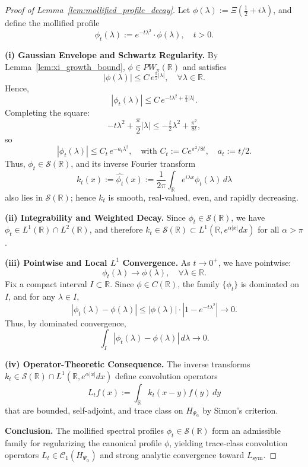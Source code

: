 \begin{proof}[Proof of Lemma~\ref{lem:mollified_profile_decay}]
Let \( \phi(\lambda) := \Xi\left( \tfrac{1}{2} + i\lambda \right) \), and define the mollified profile
\[
\phi_t(\lambda) := e^{-t\lambda^2} \cdot \phi(\lambda), \quad t > 0.
\]

\medskip
\noindent\textbf{(i) Gaussian Envelope and Schwartz Regularity.}
By Lemma~\ref{lem:xi_growth_bound}, \( \phi \in PW_\pi(\mathbb{R}) \) and satisfies
\[
|\phi(\lambda)| \le C\, e^{\frac{\pi}{2} |\lambda|}, \quad \forall \lambda \in \mathbb{R}.
\]
Hence,
\[
|\phi_t(\lambda)| \le C\, e^{-t\lambda^2 + \frac{\pi}{2} |\lambda|}.
\]
Completing the square:
\[
-t\lambda^2 + \frac{\pi}{2}|\lambda| \le -\tfrac{t}{2}\lambda^2 + \tfrac{\pi^2}{8t},
\]
so
\[
|\phi_t(\lambda)| \le C_t\, e^{-a_t \lambda^2}, \quad \text{with } C_t := C e^{\pi^2/8t}, \quad a_t := t/2.
\]
Thus, \( \phi_t \in \mathcal{S}(\mathbb{R}) \), and its inverse Fourier transform
\[
k_t(x) := \widehat{\phi_t}(x) := \frac{1}{2\pi} \int_{\mathbb{R}} e^{i\lambda x} \phi_t(\lambda)\, d\lambda
\]
also lies in \( \mathcal{S}(\mathbb{R}) \); hence \( k_t \) is smooth, real-valued, even, and rapidly decreasing.

\medskip
\noindent\textbf{(ii) Integrability and Weighted Decay.}
Since \( \phi_t \in \mathcal{S}(\mathbb{R}) \), we have \( \phi_t \in L^1(\mathbb{R}) \cap L^2(\mathbb{R}) \), and therefore \( k_t \in \mathcal{S}(\mathbb{R}) \subset L^1(\mathbb{R}, e^{\alpha |x|} dx) \) for all \( \alpha > \pi \).

\medskip
\noindent\textbf{(iii) Pointwise and Local \( L^1 \) Convergence.}
As \( t \to 0^+ \), we have pointwise:
\[
\phi_t(\lambda) \to \phi(\lambda), \quad \forall \lambda \in \mathbb{R}.
\]
Fix a compact interval \( I \subset \mathbb{R} \). Since \( \phi \in C(\mathbb{R}) \), the family \( \{\phi_t\} \) is dominated on \( I \), and for any \( \lambda \in I \),
\[
|\phi_t(\lambda) - \phi(\lambda)| \le |\phi(\lambda)| \cdot |1 - e^{-t\lambda^2}| \to 0.
\]
Thus, by dominated convergence,
\[
\int_I |\phi_t(\lambda) - \phi(\lambda)|\, d\lambda \to 0.
\]

\medskip
\noindent\textbf{(iv) Operator-Theoretic Consequence.}
The inverse transforms \( k_t \in \mathcal{S}(\mathbb{R}) \cap L^1(\mathbb{R}, e^{\alpha |x|} dx) \) define convolution operators
\[
L_t f(x) := \int_{\mathbb{R}} k_t(x - y) f(y)\, dy
\]
that are bounded, self-adjoint, and trace class on \( H_{\Psi_\alpha} \) by Simon’s criterion.

\medskip
\noindent\textbf{Conclusion.}
The mollified spectral profiles \( \phi_t \in \mathcal{S}(\mathbb{R}) \) form an admissible family for regularizing the canonical profile \( \phi \), yielding trace-class convolution operators \( L_t \in \mathcal{C}_1(H_{\Psi_\alpha}) \) and strong analytic convergence toward \( L_{\mathrm{sym}} \).
\end{proof}
